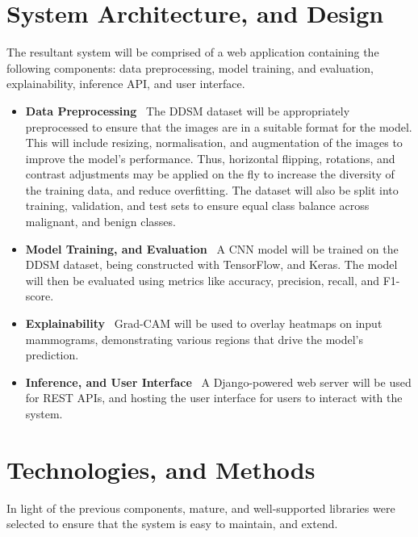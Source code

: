 \documentclass[../main]{subfiles}
\begin{document}
\section{System Architecture, and Design}
The resultant system will be comprised of a web application containing the following components: data preprocessing, model training, and evaluation, explainability, inference API, and user interface.

\begin{itemize}
	\item \textbf{Data Preprocessing} \textemdash\ The DDSM dataset will be appropriately preprocessed to ensure that the images are in a suitable format for the model. This will include resizing, normalisation, and augmentation of the images to improve the model's performance. Thus, horizontal flipping, rotations, and contrast adjustments may be applied on the fly to increase the diversity of the training data, and reduce overfitting. The dataset will also be split into training, validation, and test sets to ensure equal class balance across malignant, and benign classes.
	\item \textbf{Model Training, and Evaluation} \textemdash\ A CNN model will be trained on the DDSM dataset, being constructed with TensorFlow, and Keras. The model will then be evaluated using metrics like accuracy, precision, recall, and F1-score.
	\item \textbf{Explainability} \textemdash\ Grad-CAM will be used to overlay heatmaps on input mammograms, demonstrating various regions that drive the model's prediction.
	\item \textbf{Inference, and User Interface} \textemdash\ A Django-powered web server will be used for REST APIs, and hosting the user interface for users to interact with the system.
\end{itemize}

\section{Technologies, and Methods}
In light of the previous components, mature, and well-supported libraries were selected to ensure that the system is easy to maintain, and extend.
\end{document}
